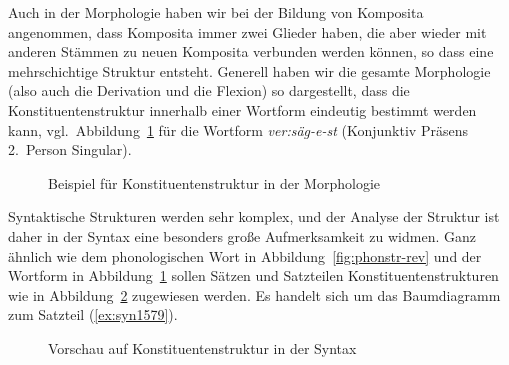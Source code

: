 Auch in der Morphologie haben wir \zB bei der Bildung von Komposita angenommen, dass Komposita immer zwei Glieder haben, die aber wieder mit anderen Stämmen zu neuen Komposita verbunden werden können, so dass eine mehrschichtige Struktur entsteht.
Generell haben wir die gesamte Morphologie (also auch die Derivation und die Flexion) so dargestellt, dass die Konstituentenstruktur innerhalb einer Wortform eindeutig bestimmt werden kann, vgl.\ Abbildung~\ref{fig:morphstr-rev} für die Wortform \textit{ver:säg-e-st} (Konjunktiv Präsens 2.~Person Singular).

\begin{figure}
  \centering
  \caption{Beispiel für Konstituentenstruktur in der Morphologie}
  \label{fig:morphstr-rev}
\end{figure}

Syntaktische Strukturen werden sehr komplex, und der Analyse der Struktur ist daher in der Syntax eine besonders große Aufmerksamkeit zu widmen.
Ganz ähnlich wie dem phonologischen Wort in Abbildung~\ref{fig:phonstr-rev} und der Wortform in Abbildung~\ref{fig:morphstr-rev} sollen Sätzen und Satzteilen Konstituentenstrukturen wie in Abbildung~\ref{fig:synstr-pre} zugewiesen werden.
Es handelt sich um das Baumdiagramm zum Satzteil (\ref{ex:syn1579}).

\begin{exe}
\end{exe}

\begin{figure}
  \centering
  \caption{Vorschau auf Konstituentenstruktur in der Syntax}
  \label{fig:synstr-pre}
\end{figure}

